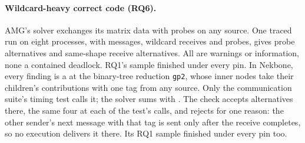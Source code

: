\paragraph{Wildcard-heavy correct code (RQ6).} AMG's solver exchanges its matrix data with
probes on any source. One traced run on eight processes, with \nAMGsends messages, \nAMGwild
wildcard receives and \nAMGprobes probes, gives \nAMGalts probe alternatives and \nAMGrecvAlts
same-shape receive alternatives. All are warnings or information, none a contained deadlock.
RQ1's sample finished under every pin. In Nekbone, every finding is a  at the
binary-tree reduction \texttt{gp2}, whose inner nodes take their children's contributions with
one tag from any source. Only the communication suite's timing test calls it; the solver sums
with . The check accepts \nNekAlts alternatives there, the same four at each
of the test's calls, and rejects \nNekRejected for one reason: the other sender's next message
with that tag is sent only after the receive completes, so no execution delivers it there. Its
RQ1 sample finished under every pin too.
